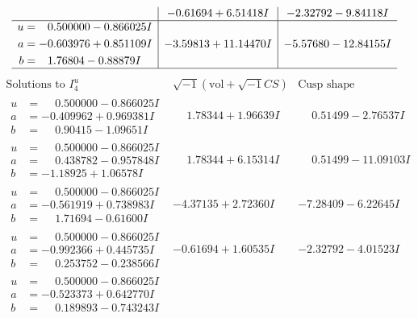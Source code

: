 \documentclass[1p]{elsarticle_modified}
\theoremstyle{definition}
\newcommand{\I}{\sqrt{-1}}
\begin{document}
$$\begin{array}{c|c|c}
 & -0.61694 + 6.51418 I & -2.32792 - 9.84118 I \\ \hline\begin{aligned}
u &= \phantom{-}0.500000 - 0.866025 I \\
a &= -0.603976 + 0.851109 I \\
b &= \phantom{-}1.76804 - 0.88879 I\end{aligned}
 & -3.59813 + 11.14470 I & -5.57680 - 12.84155 I\\
 \hline 
 \end{array}$$\newpage$$\begin{array}{c|c|c}  
\text{Solutions to }I^u_{4}& \I (\text{vol} + \sqrt{-1}CS) & \text{Cusp shape}\\
 \hline 
\begin{aligned}
u &= \phantom{-}0.500000 - 0.866025 I \\
a &= -0.409962 + 0.969381 I \\
b &= \phantom{-}0.90415 - 1.09651 I\end{aligned}
 & \phantom{-}1.78344 + 1.96639 I & \phantom{-}0.51499 - 2.76537 I \\ \hline\begin{aligned}
u &= \phantom{-}0.500000 - 0.866025 I \\
a &= \phantom{-}0.438782 - 0.957848 I \\
b &= -1.18925 + 1.06578 I\end{aligned}
 & \phantom{-}1.78344 + 6.15314 I & \phantom{-}0.51499 - 11.09103 I \\ \hline\begin{aligned}
u &= \phantom{-}0.500000 - 0.866025 I \\
a &= -0.561919 + 0.738983 I \\
b &= \phantom{-}1.71694 - 0.61600 I\end{aligned}
 & -4.37135 + 2.72360 I & -7.28409 - 6.22645 I \\ \hline\begin{aligned}
u &= \phantom{-}0.500000 - 0.866025 I \\
a &= -0.992366 + 0.445735 I \\
b &= \phantom{-}0.253752 - 0.238566 I\end{aligned}
 & -0.61694 + 1.60535 I & -2.32792 - 4.01523 I \\ \hline\begin{aligned}
u &= \phantom{-}0.500000 - 0.866025 I \\
a &= -0.523373 + 0.642770 I \\
b &= \phantom{-}0.189893 - 0.743243 I\end{aligned}

\end{array}$$
\end{document}
